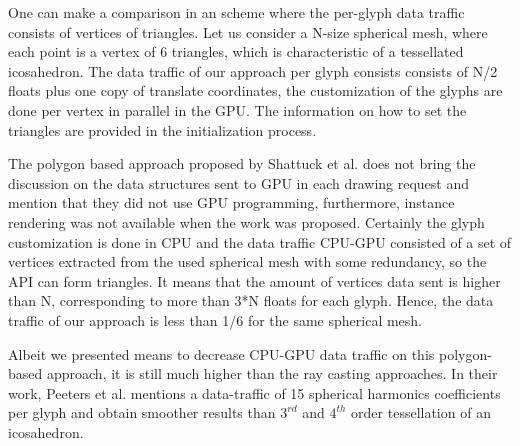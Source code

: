 \documentclass[twoside,twocolumn,10pt]{article}
\begin{document}
One can make a comparison in an scheme where the per-glyph data traffic consists of vertices of triangles. Let us consider a N-size spherical mesh, where each point is a vertex of 6 triangles, which is characteristic of a tessellated icosahedron. The data traffic of our approach per glyph consists consists of N/2 floats plus one copy of translate coordinates, the customization of the glyphs are done per vertex in parallel in the GPU. The information on how to set the triangles are provided in the initialization process.

The polygon based approach proposed by Shattuck et al. \cite{shattuck2008} does not bring the discussion on the data structures sent to GPU in each drawing request and mention that they did not use GPU programming, furthermore, instance rendering was not available when the work was proposed. Certainly the glyph customization is done in CPU and the data traffic CPU-GPU consisted of a set of vertices extracted from the used spherical mesh with some redundancy, so the API can form triangles. It means that the amount of vertices data sent is higher than N, corresponding to more than 3*N floats for each glyph. Hence, the data traffic of our approach is less than 1/6 for the same spherical mesh.






Albeit we presented means to decrease CPU-GPU data traffic on this polygon-based approach, it is still much higher than the ray casting approaches. In their work, Peeters et al. \cite{peeters2009} mentions a data-traffic of 15 spherical harmonics coefficients per glyph and obtain smoother results than $3^{rd}$ and $4^{th}$ order tessellation of an icosahedron.
\end{document}
